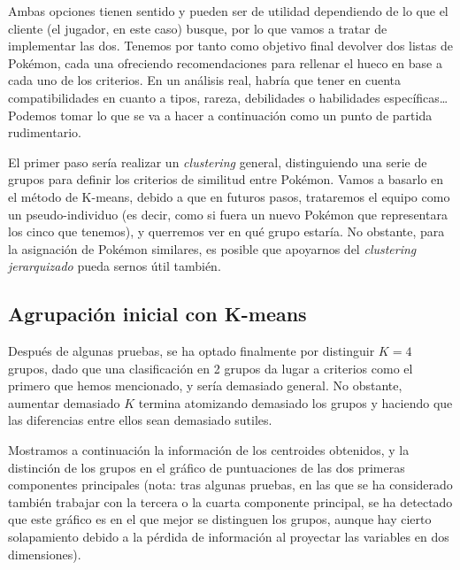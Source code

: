 \documentclass[
  12pt,
]{extreport}
\begin{document}
Ambas opciones tienen sentido y pueden ser de utilidad dependiendo de lo
que el cliente (el jugador, en este caso) busque, por lo que vamos a
tratar de implementar las dos. Tenemos por tanto como objetivo final
devolver dos listas de Pokémon, cada una ofreciendo recomendaciones para
rellenar el hueco en base a cada uno de los criterios. En un análisis
real, habría que tener en cuenta compatibilidades en cuanto a tipos,
rareza, debilidades o habilidades específicas\ldots{} Podemos tomar lo
que se va a hacer a continuación como un punto de partida rudimentario.

El primer paso sería realizar un \emph{clustering} general,
distinguiendo una serie de grupos para definir los criterios de
similitud entre Pokémon. Vamos a basarlo en el método de K-means, debido
a que en futuros pasos, trataremos el equipo como un pseudo-individuo
(es decir, como si fuera un nuevo Pokémon que representara los cinco que
tenemos), y querremos ver en qué grupo estaría. No obstante, para la
asignación de Pokémon similares, es posible que apoyarnos del
\emph{clustering jerarquizado} pueda sernos útil también.

\subsection{Agrupación inicial con
K-means}\label{agrupaciuxf3n-inicial-con-k-means}

Después de algunas pruebas, se ha optado finalmente por distinguir
\(K = 4\) grupos, dado que una clasificación en 2 grupos da lugar a
criterios como el primero que hemos mencionado, y sería demasiado
general. No obstante, aumentar demasiado \(K\) termina atomizando
demasiado los grupos y haciendo que las diferencias entre ellos sean
demasiado sutiles.

Mostramos a continuación la información de los centroides obtenidos, y
la distinción de los grupos en el gráfico de puntuaciones de las dos
primeras componentes principales (nota: tras algunas pruebas, en las que
se ha considerado también trabajar con la tercera o la cuarta componente
principal, se ha detectado que este gráfico es en el que mejor se
distinguen los grupos, aunque hay cierto solapamiento debido a la
pérdida de información al proyectar las variables en dos dimensiones).
\end{document}
